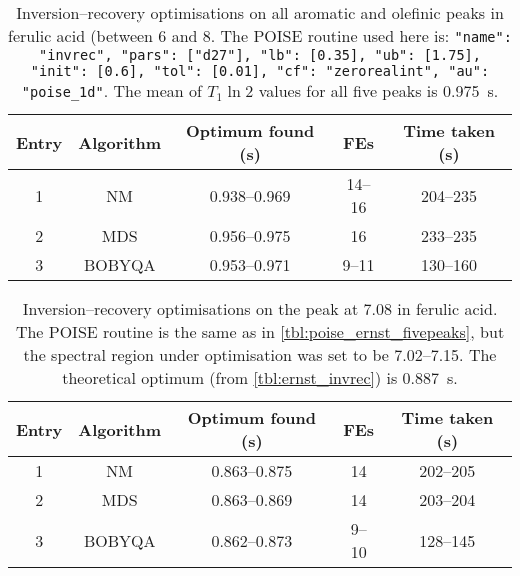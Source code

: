 \begin{table}[htb]
    \centering
    \begin{tabular}{ccccc}
        \toprule
        Entry & Algorithm & Optimum found (\unit{\s}) & FEs    & Time taken (\unit{\s}) \\
        \midrule
        1     & NM        & 0.938--0.969            & 14--16 & 204--235             \\
        2     & MDS       & 0.956--0.975            & 16     & 233--235             \\
        3     & BOBYQA    & 0.953--0.971            & 9--11  & 130--160             \\
        \bottomrule
    \end{tabular}
    \caption[Inversion--recovery optimisations on a range of peaks]{
        Inversion--recovery optimisations on all aromatic and olefinic peaks in ferulic acid (between 6 and \qty{8}{\ppm}.
        The POISE routine used here is: \texttt{{"name": "invrec", "pars": ["d27"], "lb": [0.35], "ub": [1.75], "init": [0.6], "tol": [0.01], "cf": "zerorealint", "au": "poise_1d"}}.
        The mean of $T_1 \ln 2$ values for all five peaks is \qty{0.975}{\s}.
    }
    \label{tbl:invrec_fivepeaks}
\end{table}

\begin{table}[htb]
    \centering
    \begin{tabular}{ccccc}
        \toprule
        Entry & Algorithm & Optimum found (\unit{\s}) & FEs   & Time taken (\unit{\s}) \\
        \midrule
        1     & NM        & 0.863--0.875            & 14    & 202--205             \\
        2     & MDS       & 0.863--0.869            & 14    & 203--204             \\
        3     & BOBYQA    & 0.862--0.873            & 9--10 & 128--145             \\
        \bottomrule
    \end{tabular}
    \caption[Inversion--recovery optimisations on only one peak]{
        Inversion--recovery optimisations on the peak at \qty{7.08}{\ppm} in ferulic acid.
        The POISE routine is the same as in \cref{tbl:poise_ernst_fivepeaks}, but the spectral region under optimisation was set to be 7.02--\qty{7.15}{\ppm}.
        The theoretical optimum (from \cref{tbl:ernst_invrec}) is \qty{0.887}{\s}.
    }
    \label{tbl:invrec_onepeak}
\end{table}

